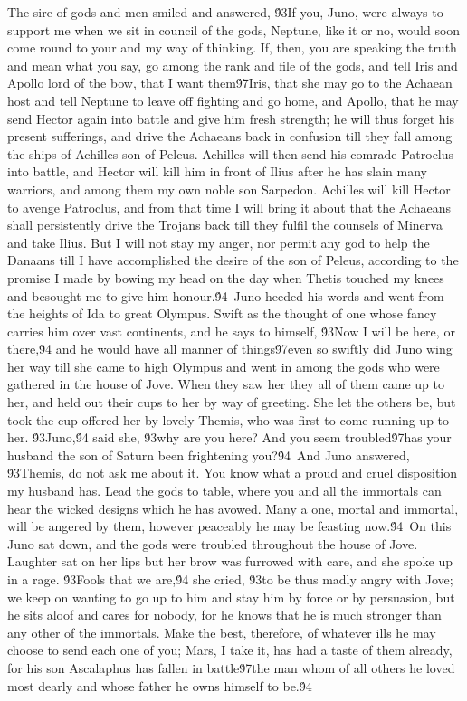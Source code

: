 {The sire of gods and men smiled and answered, \'93If you, Juno, were always to support me when we sit in council of the gods, Neptune, like it or no, would soon come round to your and my way of thinking. If, then, you are speaking the truth and mean what you say, go among the rank and file of the gods, and tell Iris and Apollo lord of the bow, that I want them\'97Iris, that she may go to the Achaean host and tell Neptune to leave off fighting and go home, and Apollo, that he may send Hector again into battle and give him fresh strength; he will thus forget his present sufferings, and drive the Achaeans back in confusion till they fall among the ships of Achilles son of Peleus. Achilles will then send his comrade Patroclus into battle, and Hector will kill him in front of Ilius after he has slain many warriors, and among them my own noble son Sarpedon. Achilles will kill Hector to avenge Patroclus, and from that time I will bring it about that the Achaeans shall persistently drive the Trojans back till they fulfil the counsels of Minerva and take Ilius. But I will not stay my anger, nor permit any god to help the Danaans till I have accomplished the desire of the son of Peleus, according to the promise I made by bowing my head on the day when Thetis touched my knees and besought me to give him honour.\'94\
Juno heeded his words and went from the heights of Ida to great Olympus. Swift as the thought of one whose fancy carries him over vast continents, and he says to himself, \'93Now I will be here, or there,\'94 and he would have all manner of things\'97even so swiftly did Juno wing her way till she came to high Olympus and went in among the gods who were gathered in the house of Jove. When they saw her they all of them came up to her, and held out their cups to her by way of greeting. She let the others be, but took the cup offered her by lovely Themis, who was first to come running up to her. \'93Juno,\'94 said she, \'93why are you here? And you seem troubled\'97has your husband the son of Saturn been frightening you?\'94\
And Juno answered, \'93Themis, do not ask me about it. You know what a proud and cruel disposition my husband has. Lead the gods to table, where you and all the immortals can hear the wicked designs which he has avowed. Many a one, mortal and immortal, will be angered by them, however peaceably he may be feasting now.\'94\
On this Juno sat down, and the gods were troubled throughout the house of Jove. Laughter sat on her lips but her brow was furrowed with care, and she spoke up in a rage. \'93Fools that we are,\'94 she cried, \'93to be thus madly angry with Jove; we keep on wanting to go up to him and stay him by force or by persuasion, but he sits aloof and cares for nobody, for he knows that he is much stronger than any other of the immortals. Make the best, therefore, of whatever ills he may choose to send each one of you; Mars, I take it, has had a taste of them already, for his son Ascalaphus has fallen in battle\'97the man whom of all others he loved most dearly and whose father he owns himself to be.\'94\
}
